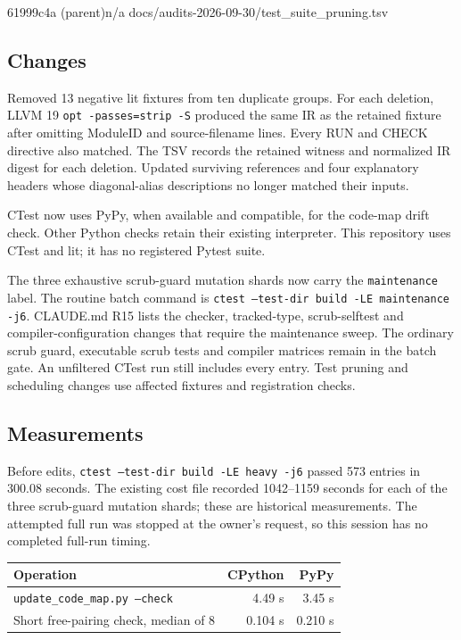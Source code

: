 %
  {61999c4a (parent)}{n/a}%
  {docs/audits-2026-09-30/test\_suite\_pruning.tsv}

\subsection*{Changes}
Removed 13 negative lit fixtures from ten duplicate groups. For each deletion,
LLVM 19 \texttt{opt -passes=strip -S} produced the same IR as the retained
fixture after omitting ModuleID and source-filename lines. Every RUN and CHECK
directive also matched. The TSV records the retained witness and normalized
IR digest for each deletion. Updated surviving references and four explanatory
headers whose diagonal-alias descriptions no longer matched their inputs.

CTest now uses PyPy, when available and compatible, for the code-map drift
check. Other Python checks retain their existing interpreter. This repository
uses CTest and lit; it has no registered Pytest suite.

The three exhaustive scrub-guard mutation shards now carry the
\texttt{maintenance} label. The routine batch command is
\texttt{ctest --test-dir build -LE maintenance -j6}. CLAUDE.md R15 lists
the checker, tracked-type, scrub-selftest and compiler-configuration changes
that require the maintenance sweep. The ordinary scrub guard, executable
scrub tests and compiler matrices remain in the batch gate. An unfiltered
CTest run still includes every entry. Test pruning and scheduling changes
use affected fixtures and registration checks.

\subsection*{Measurements}
Before edits, \texttt{ctest --test-dir build -LE heavy -j6} passed
573 entries in 300.08 seconds. The existing cost file recorded
1042--1159 seconds for each of the three scrub-guard mutation shards;
these are historical measurements. The attempted full run was stopped at
the owner's request, so this session has no completed full-run timing.

\begin{tabular}{@{}lrr@{}}\toprule
Operation & CPython & PyPy \\ \midrule
\texttt{update\_code\_map.py --check} & 4.49 s & 3.45 s \\
Short free-pairing check, median of 8 & 0.104 s & 0.210 s \\
\bottomrule\end{tabular}

